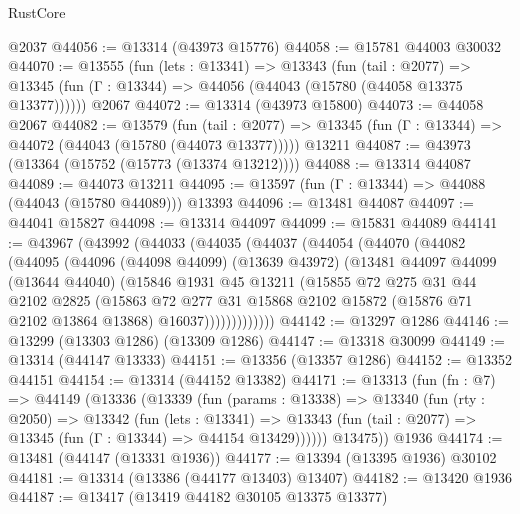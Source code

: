 \begin{lexlean}{RustCore}
\begin{coremodule}
    @2037
@44056 := @13314 (@43973 @15776)
@44058 := @15781 @44003 @30032
@44070 := @13555
    (fun (lets : @13341) =>
    @13343
      (fun (tail : @2077) =>
      @13345 (fun (Γ : @13344) => @44056 (@44043 (@15780 (@44058 @13375 @13377))))))
    @2067
@44072 := @13314 (@43973 @15800)
@44073 := @44058 @2067
@44082 := @13579
    (fun (tail : @2077) => @13345 (fun (Γ : @13344) => @44072 (@44043 (@15780 (@44073 @13377)))))
    @13211
@44087 := @43973 (@13364 (@15752 (@15773 (@13374 @13212))))
@44088 := @13314 @44087
@44089 := @44073 @13211
@44095 := @13597 (fun (Γ : @13344) => @44088 (@44043 (@15780 @44089))) @13393
@44096 := @13481 @44087
@44097 := @44041 @15827
@44098 := @13314 @44097
@44099 := @15831 @44089
@44141 := @43967
    (@43992
      (@44033
        (@44035
          (@44037
            (@44054
              (@44070
                (@44082
                  (@44095
                    (@44096
                      (@44098 @44099)
                      (@13639 @43972)
                      (@13481
                        @44097
                        @44099
                        (@13644 @44040)
                        (@15846
                          @1931
                          @45
                          @13211
                          (@15855
                            @72
                            @275
                            @31
                            @44
                            @2102
                            @2825
                            (@15863
                              @72
                              @277
                              @31
                              @15868
                              @2102
                              @15872
                              (@15876 @71 @2102 @13864 @13868)
                              @16037)))))))))))))
@44142 := @13297 @1286
@44146 := @13299 (@13303 @1286) (@13309 @1286)
@44147 := @13318 @30099
@44149 := @13314 (@44147 @13333)
@44151 := @13356 (@13357 @1286)
@44152 := @13352 @44151
@44154 := @13314 (@44152 @13382)
@44171 := @13313
    (fun (fn : @7) =>
    @44149
      (@13336
        (@13339
          (fun (params : @13338) =>
          @13340
            (fun (rty : @2050) =>
            @13342
              (fun (lets : @13341) =>
              @13343 (fun (tail : @2077) => @13345 (fun (Γ : @13344) => @44154 @13429))))))
        @13475))
    @1936
@44174 := @13481 (@44147 (@13331 @1936))
@44177 := @13394 (@13395 @1936) @30102
@44181 := @13314 (@13386 (@44177 @13403) @13407)
@44182 := @13420 @1936
@44187 := @13417 (@13419 @44182 @30105 @13375 @13377)

\end{coremodule}
\end{lexlean}
